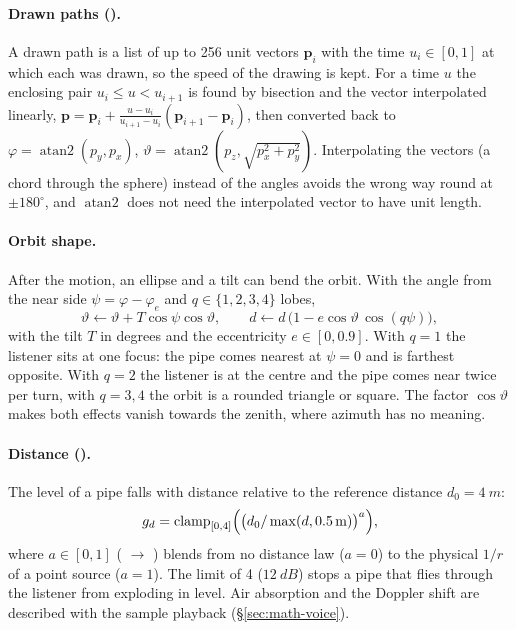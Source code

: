 \paragraph{Drawn paths ().} A drawn path is a list of up to 256 unit vectors $\mathbf{p}_i$ with
the time $u_i\in[0,1]$ at which each was drawn, so the speed of the drawing is kept. For a time $u$ the enclosing
pair $u_{i}\le u<u_{i+1}$ is found by bisection and the vector interpolated linearly,
$\mathbf{p} = \mathbf{p}_i + \tfrac{u-u_i}{u_{i+1}-u_i}(\mathbf{p}_{i+1}-\mathbf{p}_i)$, then converted back to
$\varphi = \operatorname{atan2}(p_y,p_x)$, $\vartheta = \operatorname{atan2}(p_z, \sqrt{p_x^2+p_y^2})$. Interpolating
the vectors (a chord through the sphere) instead of the angles avoids the wrong way round at $\pm180^\circ$, and
$\operatorname{atan2}$ does not need the interpolated vector to have unit length.

\paragraph{Orbit shape.} After the motion, an ellipse and a tilt can bend the orbit. With the angle from the
near side $\psi = \varphi - \varphi_e$ and $q\in\{1,2,3,4\}$ lobes,
\begin{equation}
  \vartheta \leftarrow \vartheta + T\cos\psi\cos\vartheta,\qquad
  d \leftarrow d\,\bigl(1 - e\cos\vartheta\,\cos(q\psi)\bigr),
\end{equation}
with the tilt $T$ in degrees and the eccentricity $e\in[0,0.9]$. With $q=1$ the listener sits at one focus: the
pipe comes nearest at $\psi=0$ and is farthest opposite. With $q=2$ the listener is at the centre and the pipe comes
near twice per turn, with $q=3,4$ the orbit is a rounded triangle or square. The factor $\cos\vartheta$ makes both
effects vanish towards the zenith, where azimuth has no meaning.

\paragraph{Distance ().} The level of a pipe falls with distance relative to the reference
distance $d_0 = \SI{4}{m}$:
\begin{equation}
  g_d = \operatorname{clamp}_{[0,4]}\Bigl(\bigl(d_0/\max(d,\SI{0.5}{m})\bigr)^{a}\Bigr),
\end{equation}
where $a\in[0,1]$ ( $\to$ ) blends from no distance law ($a=0$) to the physical
$1/r$ of a point source ($a=1$). The limit of 4 ($\SI{+12}{dB}$) stops a pipe that flies through the listener from
exploding in level. Air absorption and the Doppler shift are described with the sample playback
(\S\ref{sec:math-voice}).

